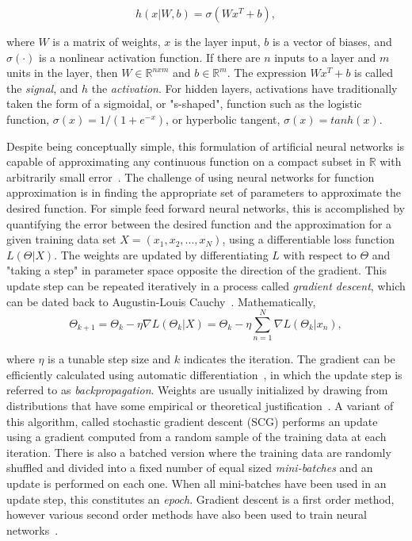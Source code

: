 \begin{equation}
h(x|W, b)=\sigma(W x^T + b),
\label{eq:denselayer}
\end{equation}

\noindent
where $W$ is a matrix of weights, $x$ is the layer input, $b$ is a vector of biases, and $\sigma(\cdot)$ is a nonlinear activation function.
If there are $n$ inputs to a layer and $m$ units in the layer, then $W\in\mathbb{R}^{nxm}$ and $b\in\mathbb{R}^{m}$.
The expression $W x^T + b$ is called the \textit{signal}, and $h$ the \textit{activation}.
For hidden layers, activations have traditionally taken the form of a sigmoidal, or "s-shaped", function such as the logistic function, $\sigma(x) = 1/(1+e^{-x})$, or hyperbolic tangent, $\sigma(x) = tanh(x)$.

Despite being conceptually simple, this formulation of artificial neural networks is capable of approximating any continuous function on a compact subset in $\mathbb{R}$ with arbitrarily small error~\cite{cybenko1989}.
The challenge of using neural networks for function approximation is in finding the appropriate set of parameters to approximate the desired function.
For simple feed forward neural networks, this is accomplished by quantifying the error between the desired function and the approximation for a given training data set $X=(x_1, x_2, ..., x_N)$, using a differentiable loss function $L(\Theta | X)$. 
The weights are updated by differentiating $L$ with respect to $\Theta$ and "taking a step" in parameter space opposite the direction of the gradient. 
This update step can be repeated iteratively in a process called \textit{gradient descent}, which can be dated back to Augustin-Louis Cauchy~\cite{cauchy1847}.
Mathematically, 
\begin{equation}
\Theta_{k+1} = \Theta_k - \eta \nabla L(\Theta_k | X) = \Theta_k - \eta \sum_{n=1}^{N} \nabla L(\Theta_k | x_n),
\label{eq:batch_gd}
\end{equation}

\noindent
where $\eta$ is a tunable step size and $k$ indicates the iteration.
The gradient can be efficiently calculated using automatic differentiation~\cite{linnainmaa1976}, in which the update step is referred to as \textit{backpropagation}.
Weights are usually initialized by drawing from distributions that have some empirical or theoretical justification~\cite{glorot2010}.
A variant of this algorithm, called stochastic gradient descent (SCG) performs an update using a gradient computed from a random sample of the training data at each iteration.
There is also a batched version where the training data are randomly shuffled and divided into a fixed number of equal sized \textit{mini-batches} and an update is performed on each one. 
When all mini-batches have been used in an update step, this constitutes an \textit{epoch}.
Gradient descent is a first order method, however various second order methods have also been used to train neural networks~\cite{fletcher1964, polak1969, moller1993, marquardt1963}.


